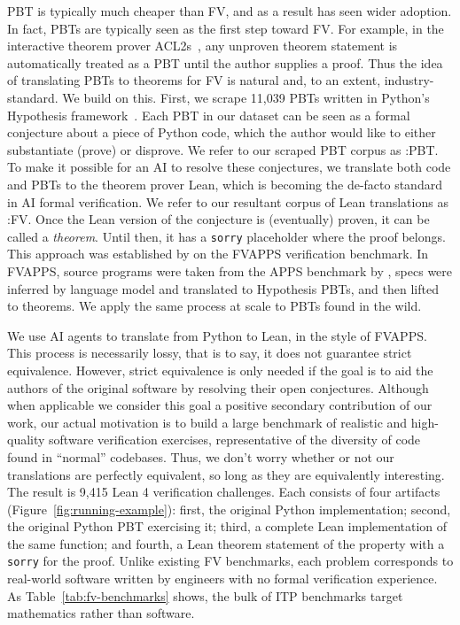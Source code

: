 PBT is typically much cheaper than FV, and as a result has seen wider adoption.
In fact, PBTs are typically seen as the first step toward FV. 
For example, in the interactive theorem prover ACL2s~\cite{dillinger2007acl2s}, any unproven theorem statement is automatically treated as a PBT until the author supplies a proof. 
Thus the idea of translating PBTs to theorems for FV is natural and, to an extent, industry-standard. We build on this. 
First, we scrape 11{,}039 PBTs written in Python's Hypothesis framework~\cite{maciver2019hypothesis}. 
Each PBT in our dataset can be seen as a formal conjecture about a piece of Python code, which the author would like to either substantiate (prove) or disprove. 
We refer to our scraped PBT corpus as \FVSpec:PBT.
To make it possible for an AI to resolve these conjectures, 
we translate both code and PBTs to the theorem prover Lean, which is becoming the de-facto standard in AI formal verification. 
We refer to our resultant corpus of Lean translations as \FVSpec:FV.
Once the Lean version of the conjecture is (eventually) proven, it can be called a \emph{theorem}.
Until then, it has a \texttt{sorry} placeholder where the proof belongs.
This approach was established by \citet{dougherty2025proving} on the FVAPPS verification benchmark. In FVAPPS, source programs were taken from the APPS benchmark by \citet{hendrycks2021apps}, specs were inferred by language model and translated to Hypothesis PBTs, and then lifted to theorems. We apply the same process at scale to PBTs found in the wild.


We use AI agents to translate from Python to Lean, in the style of FVAPPS.
This process is necessarily lossy, that is to say, it does not guarantee strict equivalence.
However, strict equivalence is only needed if the goal is to aid the authors of the original
software by resolving their open conjectures.
Although when applicable we consider this goal a positive secondary contribution of our work,
our actual motivation is to build a large benchmark of realistic and high-quality
software verification exercises, representative of the diversity of code found in 
``normal'' codebases.
Thus, we don't worry whether or not our translations are perfectly equivalent, so long as they are equivalently interesting.
The result is 9{,}415 Lean 4 verification challenges. Each consists of four artifacts (Figure~\ref{fig:running-example}): first, the original Python implementation; second, the original Python PBT exercising it; third, a complete Lean implementation of the same function; and fourth, a Lean theorem statement of the property with a \texttt{sorry} for the proof. Unlike existing FV benchmarks, each problem corresponds to real-world software written by engineers with no formal verification experience. As Table~\ref{tab:fv-benchmarks} shows, the bulk of ITP benchmarks target mathematics rather than software. 

